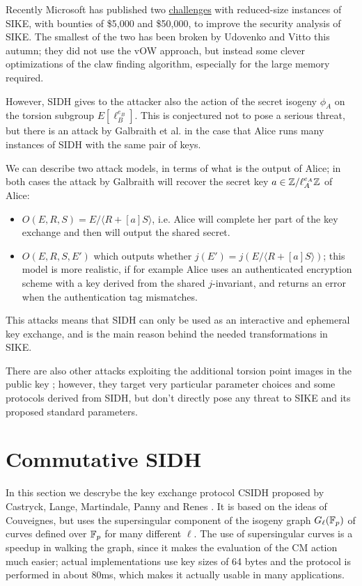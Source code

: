 Recently Microsoft has published two \href{https://www.microsoft.com/en-us/msrc/sike-cryptographic-challenge}{challenges} with reduced-size instances of SIKE, with bounties of \$5,000 and \$50,000, to improve the security analysis of SIKE. The smallest of the two has been broken by Udovenko and Vitto \cite{SIKE_challenge} this autumn; they did not use the vOW approach, but instead some clever optimizations of the claw finding algorithm, especially for the large memory required.


However, SIDH gives to the attacker also the action of the secret isogeny $\phi_A$ on the torsion subgroup $E[\ell_B^{e_B}]$. This is conjectured not to pose a serious threat, but there is an attack by Galbraith et al. \cite{Galbraith_SIKE} in the case that Alice runs many instances of SIDH with the same pair of keys.

We can describe two attack models, in terms of what is the output of Alice; in both cases the attack by Galbraith will recover the secret key $a\in\mathbb{Z}/\ell_A^{e_A}\mathbb{Z}$ of Alice:
\begin{itemize}
    \item $O(E,R,S)=E/\langle R+[a]S\rangle$, i.e. Alice will complete her part of the key exchange and then will output the shared secret.
    \item $O(E,R,S,E')$ which outputs whether $j(E')=j(E/\langle R+[a]S\rangle)$; this model is more realistic, if for example Alice uses an authenticated encryption scheme with a key derived from the shared $j$-invariant, and returns an error when the authentication tag mismatches.
\end{itemize}

This attacks means that SIDH can only be used as an interactive and ephemeral key exchange, and is the main reason behind the needed transformations in SIKE.

There are also other attacks exploiting the additional torsion point images in the public key \cite{SIDH_tp1, SIDH_tp2}; however, they target very particular parameter choices and some protocols derived from SIDH, but don't directly pose any threat to SIKE and its proposed standard parameters.

\section{Commutative SIDH}
In this section we descrybe the key exchange protocol CSIDH proposed by Castryck, Lange, Martindale, Panny and Renes \cite{CSIDH}. It is based on the ideas of Couveignes, but uses the supersingular component of the isogeny graph $G_\ell(\mathbb{F}_p)$ of curves defined over $\mathbb{F}_p$ for many different $\ell$. The use of supersingular curves is a speedup in walking the graph, since it makes the evaluation of the CM action much easier; actual implementations use key sizes of 64 bytes and the protocol is performed in about 80ms, which makes it actually usable in many applications.

